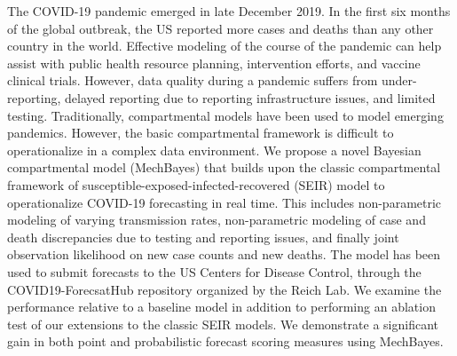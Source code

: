 \documentclass{umassthesis}          %
\begin{document}
The COVID-19 pandemic emerged in late December 2019. In the first six months of the global outbreak, the US reported more cases and deaths than any other country in the world. Effective modeling of the course of the pandemic can help assist with public health resource planning, intervention efforts, and vaccine clinical trials. However, data quality during a pandemic suffers from under-reporting, delayed reporting due to reporting infrastructure issues, and limited testing. Traditionally, compartmental models have been used to model emerging pandemics. However, the basic compartmental framework is difficult to operationalize in a complex data environment. We propose a novel Bayesian compartmental model (MechBayes) that builds upon the classic compartmental framework of susceptible-exposed-infected-recovered (SEIR) model to operationalize COVID-19 forecasting in real time. This includes non-parametric modeling of varying transmission rates, non-parametric modeling of case and death discrepancies due to testing and reporting issues, and finally joint observation likelihood on new case counts and new deaths. The model has been used to submit forecasts to the US Centers for Disease Control, through the COVID19-ForecsatHub repository organized by the Reich Lab. We examine the performance relative to a baseline model in addition to performing an ablation test of our extensions to the classic SEIR models. We demonstrate a significant gain in both point and probabilistic forecast scoring measures using MechBayes.
\end{document}
